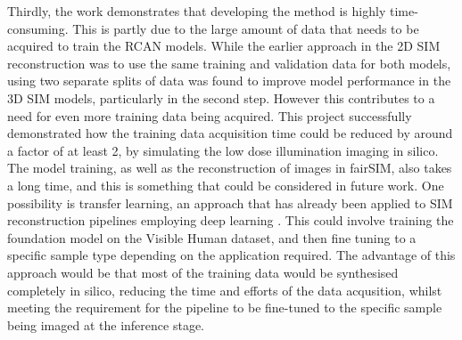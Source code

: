 \documentclass[12pt]{article}
\begin{document}
Thirdly, the work demonstrates that developing the method is highly time-consuming.
This is partly due to the large amount of data that needs to be acquired to train the RCAN models.
While the earlier approach in the 2D SIM reconstruction was to use the same training and validation data for both models,
using two separate splits of data was found to improve model performance in the 3D SIM models,
particularly in the second step.
However this contributes to a need for even more training data being acquired.
This project successfully demonstrated how the training data acquisition time could be reduced by around a factor of at least 2,
by simulating the low dose illumination imaging in silico.
The model training, as well as the reconstruction of images in fairSIM,
also takes a long time, and this is something that could be considered in future work.
One possibility is transfer learning, an approach that has already been applied to SIM reconstruction pipelines employing deep learning \cite{mlsim}.
This could involve training the foundation model on the Visible Human dataset,
and then fine tuning to a specific sample type depending on the application required.
The advantage of this approach would be that most of the training data would be synthesised completely in silico,
reducing the time and efforts of the data acqusition,
whilst meeting the requirement for the pipeline to be fine-tuned to the specific sample being imaged at the inference stage.
\end{document}
